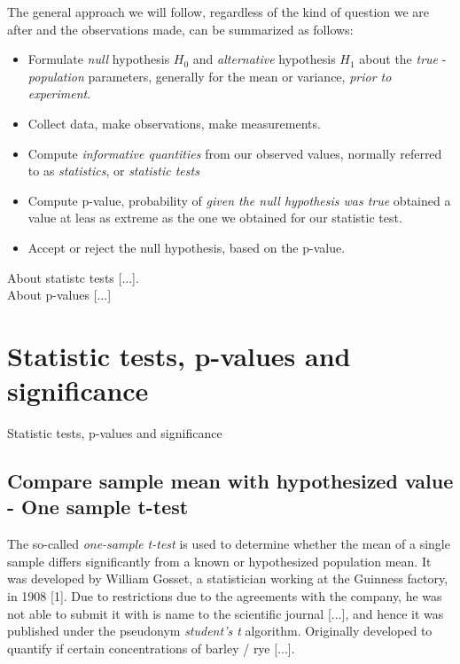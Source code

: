 \documentclass{book}
\begin{document}
The general approach we will follow, regardless of the kind of question we are after and the observations made, can be summarized as follows:
\begin{itemize}
\item Formulate \textit{null} hypothesis $H_0$ and \textit{alternative} hypothesis $H_1$ about the \textit{true} - \textit{population} parameters, generally for the mean or variance, \textit{prior to experiment}.
\item Collect data, make observations, make measurements.
\item Compute \textit{informative quantities} from our observed values, normally referred to as \textit{statistics}, or \textit{statistic tests}
\item Compute p-value, probability of \textit{given the null hypothesis was true} obtained a value at leas as extreme as the one we obtained for our statistic test.
\item Accept or reject the null hypothesis, based on the p-value.
\end{itemize}


About statistc tests [...].\\

About p-values [...] \\


\newpage

\section{Statistic tests, p-values and significance}

Statistic tests, p-values and significance

\subsection{Compare sample mean with hypothesized value - One sample t-test}

The so-called \textit{one-sample t-test} is used to determine whether the mean of a single sample differs significantly from a known or hypothesized population mean. It was developed by William Gosset, a statistician working at the Guinness factory, in 1908 [1]. Due to restrictions due to the agreements with the company, he was not able to submit it with is name to the scientific journal [...], and hence it was published under the pseudonym \textit{student's t} algorithm. Originally developed to quantify if certain concentrations of barley  / rye [...].\\
\end{document}
